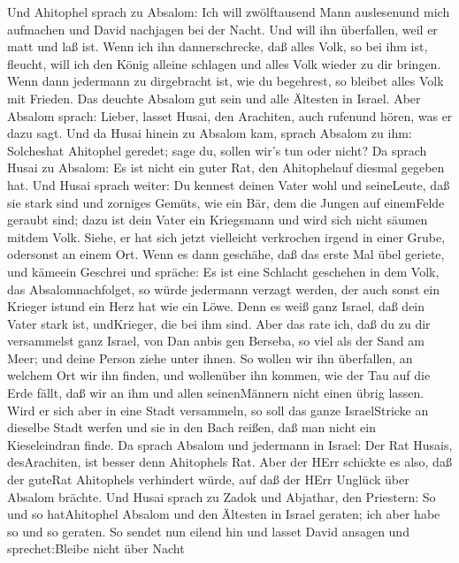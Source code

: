  Und Ahitophel sprach zu Absalom: Ich will zwölftausend Mann
auslesenund mich aufmachen und David nachjagen bei der Nacht.
 Und will ihn überfallen, weil er matt und laß ist. Wenn ich
ihn dannerschrecke, daß alles Volk, so bei ihm ist, fleucht, will ich
den König alleine schlagen  und alles Volk wieder zu dir
bringen. Wenn dann jedermann zu dirgebracht ist, wie du begehrest, so
bleibet alles Volk mit Frieden.  Das deuchte Absalom gut
sein und alle Ältesten in Israel.  Aber Absalom sprach:
Lieber, lasset Husai, den Arachiten, auch rufenund hören, was er dazu
sagt.  Und da Husai hinein zu Absalom kam, sprach Absalom zu
ihm: Solcheshat Ahitophel geredet; sage du, sollen wir's tun oder nicht?
 Da sprach Husai zu Absalom: Es ist nicht ein guter Rat, den
Ahitophelauf diesmal gegeben hat.  Und Husai sprach weiter:
Du kennest deinen Vater wohl und seineLeute, daß sie stark sind und
zorniges Gemüts, wie ein Bär, dem die Jungen auf einemFelde geraubt
sind; dazu ist dein Vater ein Kriegsmann und wird sich nicht säumen
mitdem Volk.  Siehe, er hat sich jetzt vielleicht verkrochen
irgend in einer Grube, odersonst an einem Ort. Wenn es dann geschähe,
daß das erste Mal übel geriete, und kämeein Geschrei und spräche: Es ist
eine Schlacht geschehen in dem Volk, das Absalomnachfolget,
 so würde jedermann verzagt werden, der auch sonst ein
Krieger istund ein Herz hat wie ein Löwe. Denn es weiß ganz Israel, daß
dein Vater stark ist, undKrieger, die bei ihm sind.  Aber
das rate ich, daß du zu dir versammelst ganz Israel, von Dan anbis gen
Berseba, so viel als der Sand am Meer; und deine Person ziehe unter
ihnen.  So wollen wir ihn überfallen, an welchem Ort wir
ihn finden, und wollenüber ihn kommen, wie der Tau auf die Erde fällt,
daß wir an ihm und allen seinenMännern nicht einen übrig lassen.
 Wird er sich aber in eine Stadt versammeln, so soll das
ganze IsraelStricke an dieselbe Stadt werfen und sie in den Bach reißen,
daß man nicht ein Kieseleindran finde.  Da sprach Absalom
und jedermann in Israel: Der Rat Husais, desArachiten, ist besser denn
Ahitophels Rat. Aber der HErr schickte es also, daß der guteRat
Ahitophels verhindert würde, auf daß der HErr Unglück über Absalom
brächte.  Und Husai sprach zu Zadok und Abjathar, den
Priestern: So und so hatAhitophel Absalom und den Ältesten in Israel
geraten; ich aber habe so und so geraten.  So sendet nun
eilend hin und lasset David ansagen und sprechet:Bleibe nicht über Nacht
